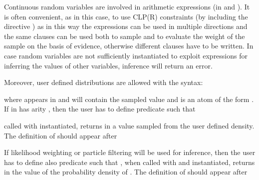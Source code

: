 \documentclass[letterpaper,10pt,english]{sphinxmanual}
\begin{document}
Continuous random variables are involved in arithmetic expressions (in  and ).
It is often convenient, as in this case, to use CLP(R) constraints (by including the directive ) as in this way the expressions can be used in multiple directions and the same clauses can be used both to sample and to evaluate the weight of the sample on the basis of evidence, otherwise different clauses have to be written.
In case random variables are not sufficiently instantiated to exploit expressions for inferring the values of other variables, inference will return an error.

Moreover, user defined distributions are allowed with the syntax:

\begin{sphinxVerbatim}[commandchars=\\\{\}]
\end{sphinxVerbatim}

where  appears in  and will contain the sampled value and  is an atom of the form .
If  in  has arity , then the user has to define predicate  such that

\begin{sphinxVerbatim}[commandchars=\\\{\}]
\end{sphinxVerbatim}

called with  instantiated, returns in  a value sampled from the user defined density.
The definition of  should appear after 

If likelihood weighting or particle filtering will be used for inference, then the user has to define also predicate  such that , when called with  and  instantiated, returns in  the value of the probability density of . The definition of  should appear after 
\end{document}
